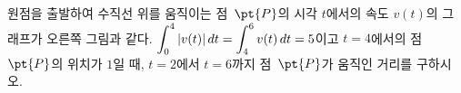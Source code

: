 \noindent\begin{minipage}[t]{0.58\linewidth}\vspace{0pt}\raggedright 원점을 출발하여 수직선 위를 움직이는 점~$\pt{P}$의 시각 $t$에서의 속도 $v(t)$의 그래프가 오른쪽 그림과 같다. $\displaystyle\int_{0}^{4}|v(t)|\mkern3mu dt=\int_{4}^{6} v(t)\mkern3mu dt=5$이고 $t=4$에서의 점~$\pt{P}$의 위치가 $1$일 때, $t=2$에서 $t=6$까지 점~$\pt{P}$가 움직인 거리를 구하시오.\end{minipage}\hfill\begin{minipage}[t]{0.4\linewidth}\vspace{0pt}\centering \resizebox{\ifdim\width>\linewidth\linewidth\else\width\fi}{!}{}\end{minipage}\par
